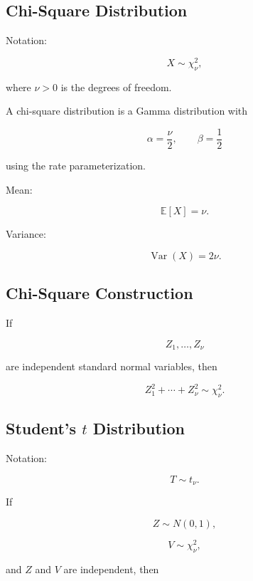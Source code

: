 \subsection{Chi-Square Distribution}
\label{subsec:chi-square-distribution-reference}

Notation:

\[
\boxed{
X\sim\chi_\nu^2,
}
\]

where \(\nu>0\) is the degrees of freedom.

A chi-square distribution is a Gamma distribution with

\[
\boxed{
\alpha=\frac{\nu}{2},
\qquad
\beta=\frac12
}
\]

using the rate parameterization.

Mean:

\[
\boxed{
\mathbb{E}[X]
=
\nu.
}
\]

Variance:

\[
\boxed{
\operatorname{Var}(X)
=
2\nu.
}
\]

\subsection{Chi-Square Construction}
\label{subsec:chi-square-construction}

If

\[
Z_1,\ldots,Z_\nu
\]

are independent standard normal variables, then

\[
\boxed{
Z_1^2+\cdots+Z_\nu^2
\sim
\chi_\nu^2.
}
\]

\subsection{Student's \(t\) Distribution}
\label{subsec:student-t-distribution-reference}

Notation:

\[
\boxed{
T\sim t_\nu.
}
\]

If

\[
Z\sim N(0,1),
\]

\[
V\sim\chi_\nu^2,
\]

and \(Z\) and \(V\) are independent, then


